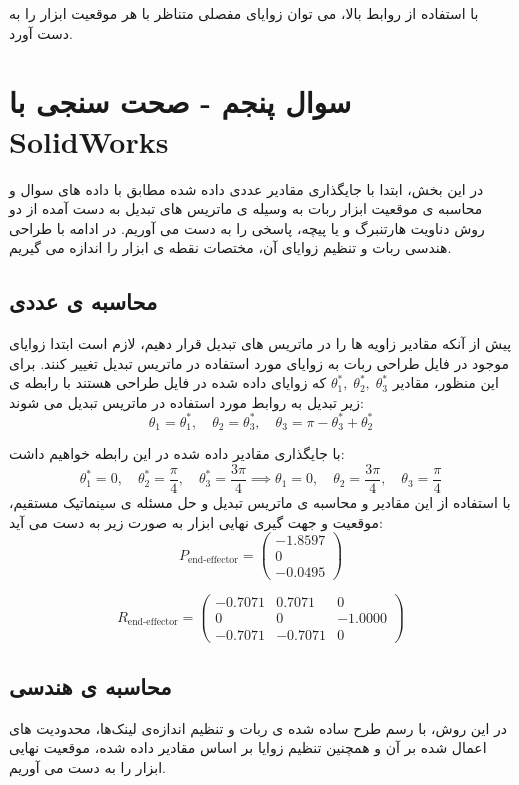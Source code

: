 \documentclass{article}
\begin{document}
با استفاده از روابط بالا، می توان زوایای مفصلی متناظر با هر موقعیت ابزار را به دست آورد.

\section{سوال پنجم - صحت سنجی با SolidWorks}\label{Section3}

در این بخش، ابتدا با جایگذاری مقادیر عددی داده شده مطابق با داده های سوال و محاسبه ی موقعیت ابزار ربات به وسیله ی ماتریس های تبدیل به دست آمده از دو روش دناویت هارتنبرگ و یا پیچه، پاسخی را به دست می آوریم. در ادامه با طراحی هندسی ربات و تنظیم زوایای آن، مختصات نقطه ی ابزار را اندازه می گیریم.

\subsection{محاسبه ی عددی}
پیش از آنکه مقادیر زاویه ها را در ماتریس های تبدیل قرار دهیم، لازم است ابتدا زوایای موجود در فایل طراحی ربات به زوایای مورد استفاده در ماتریس تبدیل تغییر کنند. 
برای این منظور، مقادیر \(\theta_1^*, \; \theta_2^*, \; \theta_3^*\)
که زوایای داده شده در فایل طراحی هستند با رابطه ی زیر تبدیل به روابط مورد استفاده در ماتریس تبدیل می شوند:
\[
\theta_1 = \theta_1^*, \quad \theta_2 = \theta_3^*, \quad \theta_3 = \pi - \theta_3^* + \theta_2^*
\]

با جایگذاری مقادیر داده شده در این رابطه خواهیم داشت:
\[
\theta_1^* = 0, \quad \theta_2^* = \frac{\pi}{4}, \quad \theta_3^* = \frac{3\pi}{4}
\implies
\theta_1 = 0, \quad \theta_2 = \frac{3\pi}{4}, \quad \theta_3 = \frac{\pi}{4}
\]
با استفاده از این مقادیر و محاسبه ی ماتریس تبدیل و حل مسئله ی سینماتیک مستقیم، موقعیت و جهت گیری نهایی ابزار به صورت زیر به دست می آید:
\[
P_{\text{end-effector}} =
\begin{pmatrix}
-1.8597 \\
0 \\
-0.0495
\end{pmatrix}
\]

\[
R_{\text{end-effector}} =
\begin{pmatrix}
-0.7071 & 0.7071 & 0 \\
0 & 0 & -1.0000 \\
-0.7071 & -0.7071 & 0
\end{pmatrix}
\]

\subsection{محاسبه ی هندسی}
در این روش، با رسم طرح ساده شده ی ربات و تنظیم اندازه‌ی لینک‌ها، محدودیت های اعمال شده بر آن و همچنین تنظیم زوایا بر اساس مقادیر داده شده، موقعیت نهایی ابزار را به دست می آوریم. 
\end{document}

